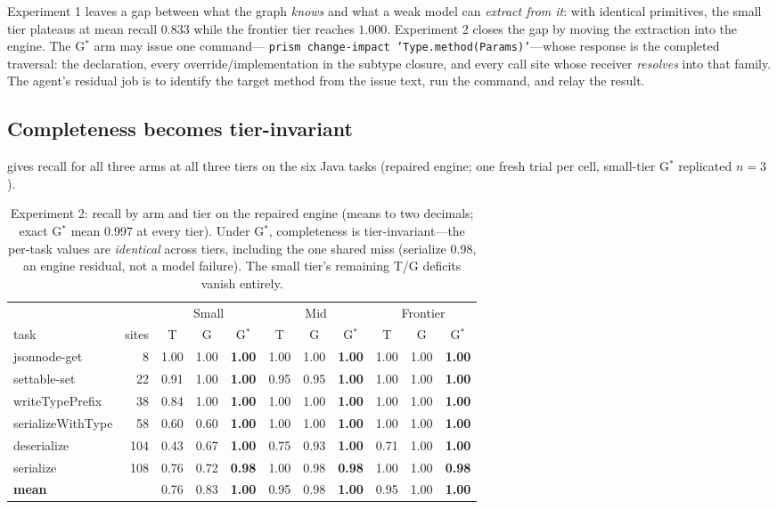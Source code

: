 \documentclass[11pt]{article}
\newcommand{\code}[1]{\texttt{#1}}
\newcommand{\gstar}{G$^{*}$}
\begin{document}
Experiment 1 leaves a gap between what the graph \emph{knows} and what a weak
model can \emph{extract from it}: with identical primitives, the small tier
plateaus at mean recall $0.833$ while the frontier tier reaches $1.000$.
Experiment 2 closes the gap by moving the extraction into the engine. The
\gstar{} arm may issue one command---%
\code{prism change-impact 'Type.method(Params)'}---whose response is the
completed traversal: the declaration, every override/implementation in the
subtype closure, and every call site whose receiver \emph{resolves} into that
family. The agent's residual job is to identify the target method from the issue
text, run the command, and relay the result.

\subsection{Completeness becomes tier-invariant}
 gives recall for all three arms at all three tiers on the six
Java tasks (repaired engine; one fresh trial per cell, small-tier \gstar{}
replicated $n{=}3$).

\begin{table}[ht]
\centering
\small
\setlength{\tabcolsep}{4.5pt}
\begin{tabular}{lrccccccccc}
\toprule
& & \multicolumn{3}{c}{Small} & \multicolumn{3}{c}{Mid} & \multicolumn{3}{c}{Frontier} \\
\cmidrule(lr){3-5}\cmidrule(lr){6-8}\cmidrule(lr){9-11}
task & sites & T & G & \gstar{} & T & G & \gstar{} & T & G & \gstar{} \\
\midrule
jsonnode-get      & 8   & 1.00 & 1.00 & \textbf{1.00} & 1.00 & 1.00 & \textbf{1.00} & 1.00 & 1.00 & \textbf{1.00} \\
settable-set      & 22  & 0.91 & 1.00 & \textbf{1.00} & 0.95 & 0.95 & \textbf{1.00} & 1.00 & 1.00 & \textbf{1.00} \\
writeTypePrefix   & 38  & 0.84 & 1.00 & \textbf{1.00} & 1.00 & 1.00 & \textbf{1.00} & 1.00 & 1.00 & \textbf{1.00} \\
serializeWithType & 58  & 0.60 & 0.60 & \textbf{1.00} & 1.00 & 1.00 & \textbf{1.00} & 1.00 & 1.00 & \textbf{1.00} \\
deserialize       & 104 & 0.43 & 0.67 & \textbf{1.00} & 0.75 & 0.93 & \textbf{1.00} & 0.71 & 1.00 & \textbf{1.00} \\
serialize         & 108 & 0.76 & 0.72 & \textbf{0.98} & 1.00 & 0.98 & \textbf{0.98} & 1.00 & 1.00 & \textbf{0.98} \\
\midrule
\textbf{mean}     &     & 0.76 & 0.83 & \textbf{1.00} & 0.95 & 0.98 & \textbf{1.00} & 0.95 & 1.00 & \textbf{1.00} \\
\bottomrule
\end{tabular}
\caption{Experiment 2: recall by arm and tier on the repaired engine (means to
two decimals; exact \gstar{} mean 0.997 at every tier). Under \gstar{},
completeness is tier-invariant---the per-task values are \emph{identical} across
tiers, including the one shared miss (serialize 0.98, an engine residual, not a
model failure). The small tier's remaining T/G deficits vanish entirely.}
\label{tab:altitude}
\end{table}
\end{document}
